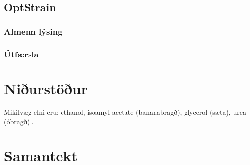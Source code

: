 \documentclass[12pt]{article}
\begin{document}
\subsection{OptStrain}
\label{sec:optstrain}
\subsubsection{Almenn lýsing}
\subsubsection{Útfærsla}

\section{Niðurstöður}

Mikilvæg efni eru: ethanol, isoamyl acetate (bananabragð), glycerol (sæta), urea (óbragð) \cite{dequin2001potential}.


\section{Samantekt}


\appendix


\end{document}
